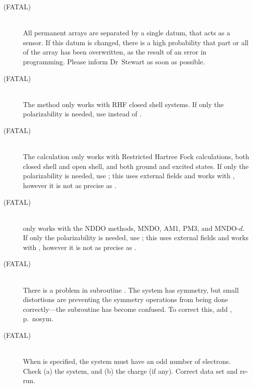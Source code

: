 \begin{description}
\item[ (FATAL)]~\\
All permanent arrays are separated by a single datum, that acts as a sensor.
If this datum is changed, there is a high probability that part or all of the array
has been overwritten, as the result of an error in programming.  Please inform 
Dr~Stewart as soon as possible.

\item[ (FATAL)]~\\
The  method only works with RHF closed shell systems.  If only the
polarizability is needed, use  instead of .

\item[ (FATAL)]~\\
The  calculation only works with Restricted Hartree Fock calculations,
both closed shell and open shell, and both ground and excited states.
If only the polarizability is needed, use ; this uses external
fields and works with , however it is not as precise as .

\item[ (FATAL)]~\\
 only works with the NDDO methods, MNDO, AM1, PM3, and MNDO-$d$.
If only the polarizability is needed, use ; this uses external
fields and works with , however it is not as precise as .

\item[ (FATAL)]~\\
There is a problem in subroutine .  The system has symmetry, but
small distortions are preventing the symmetry operations from being done
correctly---the subroutine has become confused.  To correct this, add
\hyperref[pageref]{}{, p.~}{}{nosym}.

\item[ (FATAL)]~\\
When  is specified, the system must have an odd number of 
electrons.  Check (a) the system, and (b) the charge (if any).  Correct
data set and re-run. 


\end{description}
